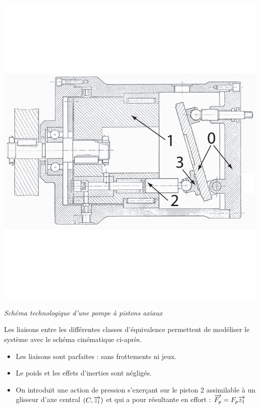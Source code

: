 \documentclass[10pt,fleqn]{article} %
\begin{document}
\begin{multicols}{2}
\begin{multicols}{2}
\begin{center}
  \includegraphics[width=.9\linewidth]{images/pompe.pdf}
  
  \textit{Schéma technologique d'une pompe à pistons axiaux \label{fig:techno_pompe}}

\end{center}


Les liaisons entre les différentes classes d'équivalence permettent de modéliser le système avec le schéma cinématique ci-après.



\begin{itemize}
\item Les liaisons sont parfaites : sans frottements ni jeux.
\item Le poids et les effets d'inerties sont négligés.
\item On introduit une action de pression s'exerçant sur le piston 2 assimilable à un glisseur d'axe central $\left(C,\overrightarrow{{z_1}}\right)$ et qui a pour résultante en effort : $\overrightarrow{F_p}=F_p\overrightarrow{z_1}$
\end{itemize}



\end{multicols}
\end{multicols}
\end{document}
